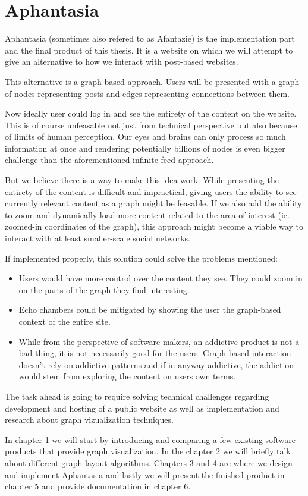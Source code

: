 \section*{Aphantasia}
Aphantasia (sometimes also refered to as Afantazie) is the implementation part and the final product of this thesis.
It is a website on which we will attempt to give an alternative to how we interact with post-based websites.

This alternative is a graph-based approach.
Users will be presented with a graph of nodes representing posts and edges representing connections between them.

Now ideally user could log in and see the entirety of the content on the website.
This is of course unfeasable not just from technical perspective but also because of limits of human perception.
Our eyes and brains can only process so much information at once
and rendering potentially billions of nodes is even bigger challenge than the aforementioned infinite feed approach.

But we believe there is a way to make this idea work.
While presenting the entirety of the content is difficult and impractical,
giving users the ability to see currently relevant content as a graph might be feasable.
If we also add the ability to zoom and dynamically load more content related to the area of interest (ie. zoomed-in coordinates of the graph),
this approach might become a viable way to interact with at least smaller-scale social networks.

If implemented properly, this solution could solve the problems mentioned:
\begin{itemize}
  \item Users would have more control over the content they see. They could zoom in on the parts of the graph they find interesting.
  \item Echo chambers could be mitigated by showing the user the graph-based context of the entire site.
  \item While from the perspective of software makers, an addictive product is not a bad thing, it is not necessarily good for the users.
    Graph-based interaction doesn't rely on addictive patterns and if in anyway addictive,
    the addiction would stem from exploring the content on users own terms.
\end{itemize}


The task ahead is going to require solving technical challenges regarding development and hosting of a public website
as well as implementation and research about graph vizualization techniques.

In chapter 1 we will start by introducing and comparing a few existing software products that provide graph visualization.
In the chapter 2 we will briefly talk about different graph layout algorithms.
Chapters 3 and 4 are where we design and implement Aphantasia
and lastly we will present the finished product in chapter 5 and provide documentation in chapter 6.